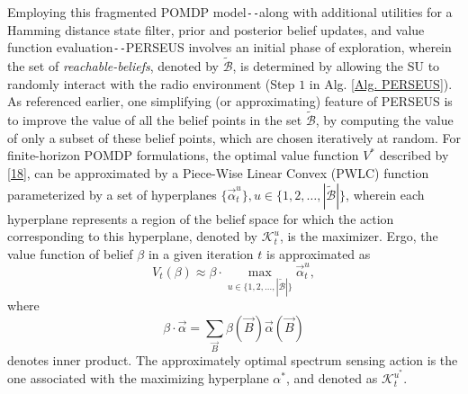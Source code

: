 \documentclass[12pt, draftcls, onecolumn]{IEEEtran}
\begin{document}
Employing this fragmented POMDP model\texttt{-{}-}along with additional utilities for a Hamming distance state filter, prior and posterior belief updates, and value function evaluation\texttt{-{}-}PERSEUS involves an initial phase of exploration, wherein the set of \emph{reachable-beliefs}, denoted by $\tilde{\mathcal{B}}$, is determined by allowing the SU to randomly interact with the radio environment (Step $1$ in Alg. \ref{Alg. PERSEUS}). As referenced earlier, one simplifying (or approximating) feature of PERSEUS is to improve the value of all the belief points in the set $\tilde{\mathcal{B}}$, by computing the value of only a subset of these belief points, which are chosen iteratively at random. For finite-horizon POMDP formulations, the optimal value function $V^{*}$ described by \eqref{18}, can be approximated by a Piece-Wise Linear Convex (PWLC) function \cite{WCL:13} parameterized by a set of hyperplanes $\{\vec{\alpha}_{t}^{u}\},u{\in}\{1,2,\dots,|\tilde{\mathcal{B}}|\}$, wherein each hyperplane represents a region of the belief space for which the action corresponding to this hyperplane, denoted by $\mathcal{K}_{t}^{u}$, is the maximizer. Ergo, the value function of belief $\beta$ in a given iteration $t$ is approximated as
\begin{equation}\label{22}
    V_{t}(\beta) \approx \beta \cdot \max_{u \in \{1,2,\dots,|\tilde{\mathcal{B}}|\}} \vec{\alpha}_{t}^{u},
\end{equation}
where
\begin{equation}\label{24}
    \beta \cdot \vec{\alpha}=\sum_{\vec{B}}\beta(\vec{B})\vec{\alpha}(\vec{B})
\end{equation}
denotes inner product. The approximately optimal spectrum sensing action is the one associated with the maximizing hyperplane $\alpha^*$, and denoted as $\mathcal{K}_{t}^{u^{*}}$.
\end{document}
